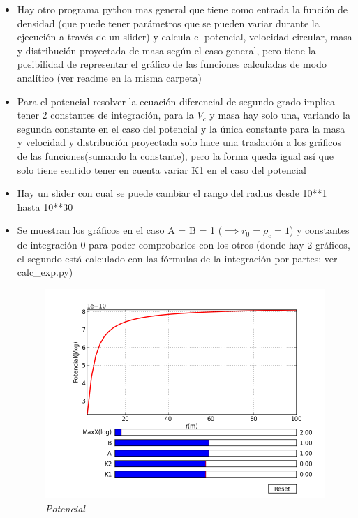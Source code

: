\documentclass[12pt]{book}
\begin{document}
\begin{itemize}
	\item Hay otro programa python mas general que tiene como entrada la función de densidad (que puede tener parámetros que se pueden variar durante la ejecución a través de un slider) y calcula el potencial, velocidad circular, masa y distribución proyectada de masa según el caso general, pero tiene la posibilidad de representar el gráfico de las funciones calculadas de modo analítico (ver readme en la misma carpeta)
\item Para el potencial resolver la ecuación diferencial de segundo grado implica tener 2 constantes de integración, para la $V_c$ y masa hay solo una, variando la segunda constante en el caso del potencial y la única constante para la masa y velocidad y distribución proyectada solo hace una traslación a los gráficos de las funciones(sumando la constante), pero la forma queda igual así que solo tiene sentido tener en cuenta variar K1 en el caso del potencial 
\item Hay un slider con cual se puede cambiar el rango del radius desde 10**1 hasta 10**30
\item Se muestran los gráficos en el caso A = B = 1 ($\implies r_0= \rho_c =1$) y constantes de integración 0 para poder comprobarlos con los otros (donde hay 2 gráficos, el segundo está calculado con las fórmulas de la integración por partes: ver calc\_exp.py)

\begin{figure}[!ht]
 \centering
 \includegraphics[scale=0.33]{pt_pot_A1_B1.png}
 \caption{\emph{Potencial}}
\end{figure}


\end{itemize}
\end{document}
